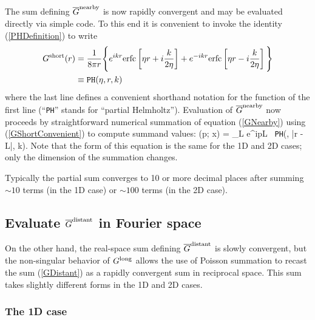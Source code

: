 \documentclass[letterpaper]{article}
\newcommand{\GB}{\overline{G}}
\newcommand{\erfc}{\text{erfc}}
\begin{document}
The sum defining $\GB\sups{nearby}$ is now rapidly convergent
and may be evaluated directly via simple code. To this end
it is convenient to invoke the identity (\ref{PHDefinition})
to write
\begin{align}
  G\sups{short}(r)
&= \frac{1}{8\pi r}
     \Bigg\{ e^{ ikr} \erfc\left[  \eta r
                                 +i\frac{k}{2\eta}\right]
            +e^{-ikr} \erfc\left[ \eta r
                                 -i\frac{k}{2\eta}\right]
     \Bigg\}
\label{GShortConvenient} \\
&\equiv \texttt{PH}(\eta, r, k)
\end{align}
where the last line defines a convenient shorthand notation
for the function of the first line (``\texttt{PH}'' stands
for ``partial Helmholtz'').
Evaluation of $\GB\sups{nearby}$ now proceeds by straightforward
numerical summation of equation (\ref{GNearby}) using
(\ref{GShortConvenient}) to compute summand values: 
{
 \GB{}(\vb p; \vb x) = \sum_{\vb L} e^{i\vb p\cdot \vb L}
   \, \texttt{PH}\Big(\eta, |\vb r - \vb L|, k\Big).
}
Note that the form of this equation is the same for the 
1D and 2D cases; only the dimension of the summation 
changes.

Typically
the partial sum converges to 10 or more decimal places after
summing $\sim 10$ terms (in the 1D case) or $\sim 100$ terms
(in the 2D case).

\subsection{Evaluate $\GB\sups{distant}$ in Fourier space}

On the other hand, the real-space sum defining $\GB\sups{distant}$ 
is slowly convergent, but the non-singular behavior of $G^{\hbox{\scriptsize{long}}}$
allows the use of Poisson summation to recast the sum (\ref{GDistant}) 
as a rapidly convergent sum in reciprocal space. This sum takes
slightly different forms in the 1D and 2D cases.

\subsubsection{The 1D case}
\end{document}
